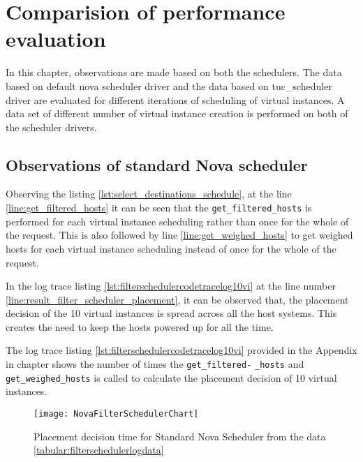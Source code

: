 
\chapter{Comparision of performance evaluation}\label{ch:comparisionofbothscheduler}

In this chapter, observations are made based on both the schedulers.
The data based on default nova scheduler driver and the data based on tuc\_scheduler driver are evaluated for different iterations of scheduling of virtual instances.
A data set of different number of virtual instance creation is performed on both of the scheduler drivers.



\section{Observations of standard Nova scheduler}\label{sec:observationsofstandardnova}

Observing the listing \ref{lst:select_destinations_schedule}, at the line \ref{line:get_filtered_hosts} it can be seen that the \verb|get_filtered_hosts| is performed for each virtual instance scheduling rather than once for the whole of the request. This is also followed by line \ref{line:get_weighed_hosts} to get weighed hosts for each virtual instance scheduling instead of once for the whole of the request.

In the log trace listing \ref{lst:filterschedulercodetracelog10vi} at the line number \ref{line:result_filter_scheduler_placement}, it can be observed that, the placement decision of the 10 virtual instances is spread across all the host systems.
This creates the need to keep the hosts powered up for all the time.

The log trace listing \ref{lst:filterschedulercodetracelog10vi} provided in the Appendix  in chapter  shows the number of times the \verb|get_filtered-| \verb|_hosts| and \verb|get_weighed_hosts| is called to calculate the placement decision of 10 virtual instances.

\begin{figure}[H]
	\begin{center}
		\texttt{[image: NovaFilterSchedulerChart]}
		\caption{Placement decision time for Standard Nova Scheduler from the data \ref{tabular:filterschedulerlogdata}}
		\label{fig:NovaFilterSchedulerChart}
	\end{center}
	\vspace{-10pt}
\end{figure}

